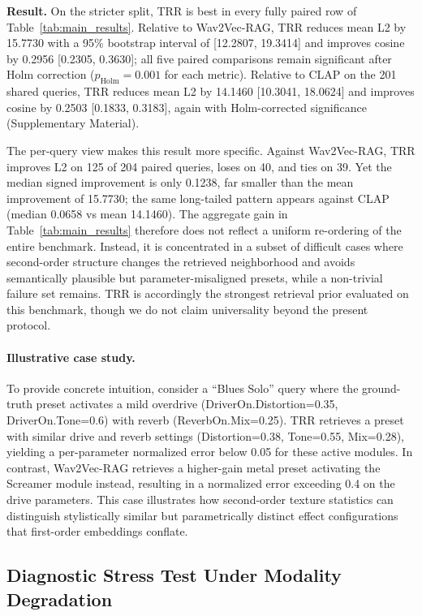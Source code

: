 \textbf{Result.} On the stricter split, TRR is best in every fully paired row of Table~\ref{tab:main_results}. Relative to Wav2Vec-RAG, TRR reduces mean L2 by 15.7730 with a 95\% bootstrap interval of [12.2807, 19.3414] and improves cosine by 0.2956 [0.2305, 0.3630]; all five paired comparisons remain significant after Holm correction ($p_{\mathrm{Holm}}=0.001$ for each metric). Relative to CLAP on the 201 shared queries, TRR reduces mean L2 by 14.1460 [10.3041, 18.0624] and improves cosine by 0.2503 [0.1833, 0.3183], again with Holm-corrected significance (Supplementary Material).

The per-query view makes this result more specific. Against Wav2Vec-RAG, TRR improves L2 on 125 of 204 paired queries, loses on 40, and ties on 39. Yet the median signed improvement is only 0.1238, far smaller than the mean improvement of 15.7730; the same long-tailed pattern appears against CLAP (median 0.0658 vs mean 14.1460). The aggregate gain in Table~\ref{tab:main_results} therefore does not reflect a uniform re-ordering of the entire benchmark. Instead, it is concentrated in a subset of difficult cases where second-order structure changes the retrieved neighborhood and avoids semantically plausible but parameter-misaligned presets, while a non-trivial failure set remains. TRR is accordingly the strongest retrieval prior evaluated on this benchmark, though we do not claim universality beyond the present protocol.

\paragraph{Illustrative case study.}
To provide concrete intuition, consider a ``Blues Solo'' query where the ground-truth preset activates a mild overdrive (DriverOn.Distortion=0.35, DriverOn.Tone=0.6) with reverb (ReverbOn.Mix=0.25). TRR retrieves a preset with similar drive and reverb settings (Distortion=0.38, Tone=0.55, Mix=0.28), yielding a per-parameter normalized error below 0.05 for these active modules. In contrast, Wav2Vec-RAG retrieves a higher-gain metal preset activating the Screamer module instead, resulting in a normalized error exceeding 0.4 on the drive parameters. This case illustrates how second-order texture statistics can distinguish stylistically similar but parametrically distinct effect configurations that first-order embeddings conflate.

\subsection{Diagnostic Stress Test Under Modality Degradation}
\label{ssec:protocolC}

